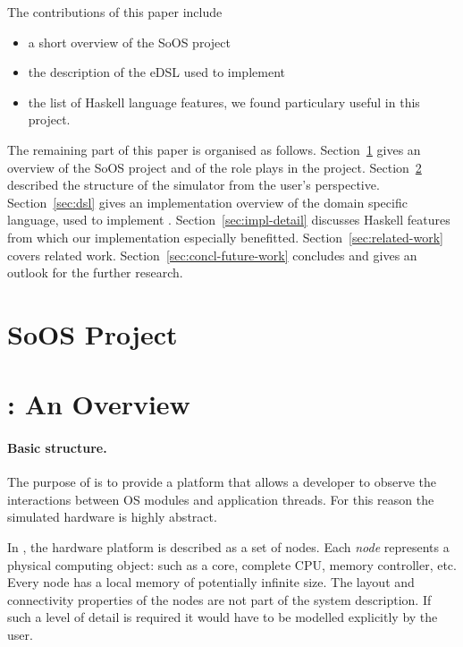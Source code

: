 The contributions of this paper include
\begin{itemize}
\item a short overview of the SoOS project
\item the description of the eDSL used to implement \soosim 
\item the list of Haskell language features, we found particulary
  useful in this project.
\end{itemize}

The remaining part of this paper is organised as
follows. Section~\ref{sec:soos-project} gives an overview of the SoOS
project and of the role \soosim plays in the
project. Section~\ref{sec:soosim-an-overview} described the structure
of the \soosim simulator from the user's
perspective. Section~\ref{sec:dsl} gives an implementation overview of
the domain specific language, used to implement
\soosim. Section~\ref{sec:impl-detail} discusses Haskell features from
which our implementation especially
benefitted. Section~\ref{sec:related-work} covers related
work. Section~\ref{sec:concl-future-work} concludes and gives an
outlook for the further research.

\section{SoOS Project}
\label{sec:soos-project}

\section{\soosim: An Overview}
\label{sec:soosim-an-overview}

\paragraph{Basic structure.} 
The purpose of \soosim is to provide a platform that allows a
developer to observe the interactions between OS modules and
application threads.  For this reason the simulated hardware is highly
abstract.

In \soosim, the hardware platform is described as a set of nodes.
Each \emph{node} represents a physical computing object: such as a
core, complete CPU, memory controller, etc.  Every node has a local
memory of potentially infinite size.  The layout and connectivity
properties of the nodes are not part of the system description.  If
such a level of detail is required it would have to be modelled
explicitly by the user.

